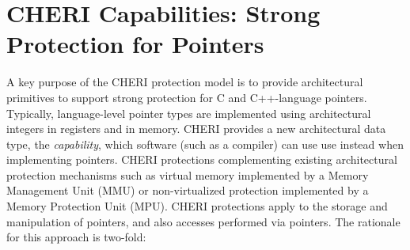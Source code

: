 \section{CHERI Capabilities: Strong Protection for Pointers}

A key purpose of the CHERI protection model is to provide architectural
primitives to support strong protection for C and C++-language pointers.
Typically, language-level pointer types are implemented using architectural
integers in registers and in memory.
CHERI provides a new architectural data type, the \textit{capability}, which
software (such as a compiler) can use use instead when implementing pointers.
CHERI protections complementing existing architectural protection mechanisms
such as virtual memory implemented by a Memory Management Unit (MMU) or
non-virtualized protection implemented by a Memory Protection Unit (MPU).
CHERI protections apply to the storage and manipulation of pointers, and also
accesses performed via pointers.
The rationale for this approach is two-fold:

